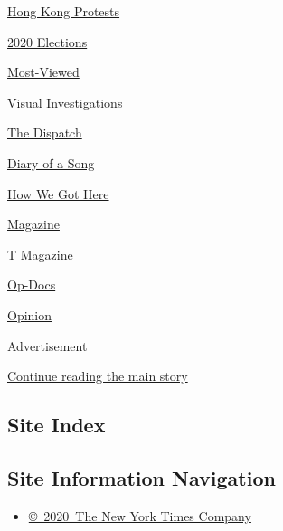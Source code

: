 \href{/video/hk-protest}{Hong Kong Protests}

\href{/video/2020-Elections}{2020 Elections}

\href{/video/Most-Viewed}{Most-Viewed}

\href{/video/investigations}{Visual Investigations}

\href{/video/on-the-ground}{The Dispatch}

\href{/video/diaryofasong}{Diary of a Song}

\href{/video/how-we-got-here}{How We Got Here}

\href{/video/magazine}{Magazine}

\href{/video/t-magazine}{T Magazine}

\href{/video/op-docs}{Op-Docs}

\href{/video/opinion}{Opinion}

Advertisement

\protect\hyperlink{after-bottom}{Continue reading the main story}

\hypertarget{site-index}{%
\subsection{Site Index}\label{site-index}}

\hypertarget{site-information-navigation}{%
\subsection{Site Information
Navigation}\label{site-information-navigation}}

\begin{itemize}
\tightlist
\item
  \href{https://help.nytimes.com/hc/en-us/articles/115014792127-Copyright-notice}{©~2020~The
  New York Times Company}
\end{itemize}

